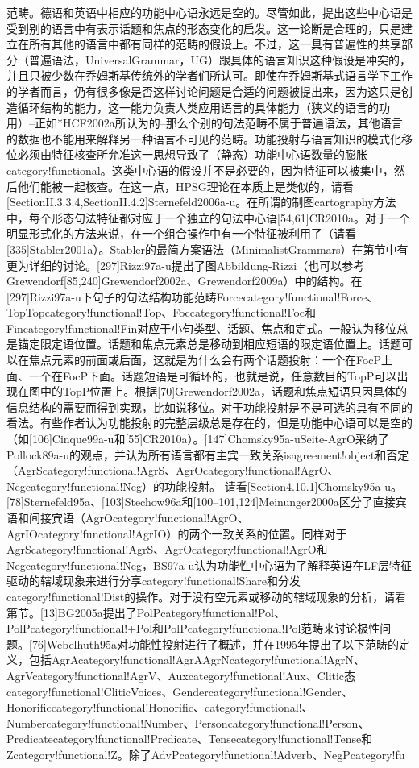 范畴。德语和英语中相应的功能中心语永远是空的。尽管如此，提出这些中心语是受到别的语言中有表示话题和焦点的形态变化的启发。这一论断是合理的，只是建立在所有其他的语言中都有同样的范畴的假设上。不过，这一具有普遍性的共享部分（普遍语法，UniversalGrammar，UG）跟具体的语言知识这种假设是冲突的，并且只被少数在乔姆斯基传统外的学者们所认可。即使在乔姆斯基式语言学下工作的学者而言，仍有很多像是否这样讨论问题是合适的问题被提出来，因为这只是创造循环结构的能力，这一能力负责人类应用语言的具体能力（狭义的语言的功用）--正如*HCF2002a所认为的--那么个别的句法范畴不属于普遍语法，其他语言的数据也不能用来解释另一种语言不可见的范畴。功能投射与语言知识的模式化移位必须由特征核查所允准这一思想导致了（静态）功能中心语数量的膨胀category!functional。这类中心语的假设并不是必要的，因为特征可以被集中，然后他们能被一起核查。在这一点，HPSG理论在本质上是类似的，请看[SectionII.3.3.4,SectionII.4.2]Sternefeld2006a-u。在所谓的制图cartography方法中，每个形态句法特征都对应于一个独立的句法中心语[54,61]CR2010a。对于一个明显形式化的方法来说，在一个组合操作中有一个特征被利用了（请看[335]Stabler2001a）。Stabler的最简方案语法（MinimalistGrammars）在第节中有更为详细的讨论。[297]Rizzi97a-u提出了图Abbildung-Rizzi（也可以参考Grewendorf[85,240]Grewendorf2002a、Grewendorf2009a）中的结构。在[297]Rizzi97a-u下句子的句法结构功能范畴Forcecategory!functional!Force、TopTopcategory!functional!Top、Foccategory!functional!Foc和Fincategory!functional!Fin对应于小句类型、话题、焦点和定式。一般认为移位总是锚定限定语位置。话题和焦点元素总是移动到相应短语的限定语位置上。话题可以在焦点元素的前面或后面，这就是为什么会有两个话题投射：一个在FocP上面、一个在FocP下面。话题短语是可循环的，也就是说，任意数目的TopP可以出现在图中的TopP位置上。根据[70]Grewendorf2002a，话题和焦点短语只因具体的信息结构的需要而得到实现，比如说移位。对于功能投射是不是可选的具有不同的看法。有些作者认为功能投射的完整层级总是存在的，但是功能中心语可以是空的（如[106]Cinque99a-u和[55]CR2010a）。[147]Chomsky95a-uSeite-AgrO采纳了Pollock89a-u的观点，并认为所有语言都有主宾一致关系isagreement!object和否定（AgrScategory!functional!AgrS、AgrOcategory!functional!AgrO、Negcategory!functional!Neg）的功能投射。	请看[Section4.10.1]Chomsky95a-u。[78]Sternefeld95a、[103]Stechow96a和[100--101,124]Meinunger2000a区分了直接宾语和间接宾语（AgrOcategory!functional!AgrO、AgrIOcategory!functional!AgrIO）的两个一致关系的位置。同样对于AgrScategory!functional!AgrS、AgrOcategory!functional!AgrO和Negcategory!functional!Neg，BS97a-u认为功能性中心语为了解释英语在LF层特征驱动的辖域现象来进行分享category!functional!Share和分发category!functional!Dist的操作。对于没有空元素或移动的辖域现象的分析，请看第节。[13]BG2005a提出了PolPcategory!functional!Pol、PolPcategory!functional!+Pol和PolPcategory!functional!Pol范畴来讨论极性问题。[76]Webelhuth95a对功能性投射进行了概述，并在1995年提出了以下范畴的定义，包括AgrAcategory!functional!AgrAAgrNcategory!functional!AgrN、AgrVcategory!functional!AgrV、Auxcategory!functional!Aux、Clitic态category!functional!CliticVoices、Gendercategory!functional!Gender、Honorificcategory!functional!Honorific、category!functional!、Numbercategory!functional!Number、Personcategory!functional!Person、Predicatecategory!functional!Predicate、Tensecategory!functional!Tense和Zcategory!functional!Z。除了AdvPcategory!functional!Adverb、NegPcategory!fu